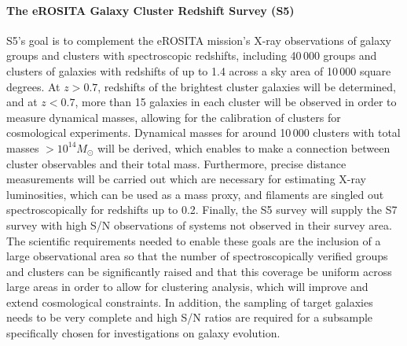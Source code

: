 \documentclass[a4paper,11pt]{article}
\begin{document}
\paragraph{The eROSITA Galaxy Cluster Redshift Survey (S5)}
S5's \citep{4mosts5} goal is to complement the eROSITA mission's \citep{erosita} X-ray observations of galaxy groups and clusters with spectroscopic redshifts, including 40\,000 groups and clusters of galaxies with redshifts of up to 1.4 across a sky area of 10\,000 square degrees. At $z>0.7$, redshifts of the brightest cluster galaxies will be determined, and at $z<0.7$, more than 15 galaxies in each cluster will be observed in order to measure dynamical masses, allowing for the calibration of clusters for cosmological experiments. Dynamical masses for around 10\,000 clusters with total masses ${>}10^{14}M_\odot$ will be derived, which enables to make a connection between cluster observables and their total mass. Furthermore, precise distance measurements will be carried out which are necessary for estimating X-ray luminosities, which can be used as a mass proxy, and filaments are singled out spectroscopically for redshifts up to 0.2. Finally, the S5 survey will supply the S7 survey with high S/N observations of systems not observed in their survey area. The scientific requirements needed to enable these goals are the inclusion of a large observational area so that the number of spectroscopically verified groups and clusters can be significantly raised and that this coverage be uniform across large areas in order to allow for clustering analysis, which will improve and extend cosmological constraints. In addition, the sampling of target galaxies needs to be very complete and high S/N ratios are required for a subsample specifically chosen for investigations on galaxy evolution.
%
\end{document}
